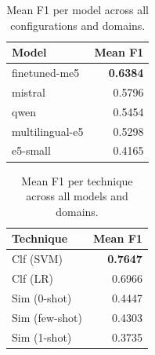 \begin{table}[ht]
\centering
\caption{Mean F1 per model across all configurations and domains.}
\label{tab:embedding_f1_models}
\begin{tabular}{lr}
\toprule
\textbf{Model} & \textbf{Mean F1} \\
\midrule
finetuned-me5 & \textbf{0.6384} \\
mistral & 0.5796 \\
qwen & 0.5454 \\
multilingual-e5 & 0.5298 \\
e5-small & 0.4165 \\
\bottomrule
\end{tabular}
\end{table}

\begin{table}[ht]
\centering
\caption{Mean F1 per technique across all models and domains.}
\label{tab:embedding_f1_techniques}
\begin{tabular}{lr}
\toprule
\textbf{Technique} & \textbf{Mean F1} \\
\midrule
Clf (SVM) & \textbf{0.7647} \\
Clf (LR) & 0.6966 \\
Sim (0-shot) & 0.4447 \\
Sim (few-shot) & 0.4303 \\
Sim (1-shot) & 0.3735 \\
\bottomrule
\end{tabular}
\end{table}